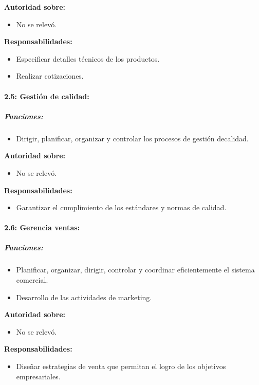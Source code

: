 \documentclass[a4paper,10pt]{article}
\begin{document}
		\textbf{Autoridad sobre:} 
		\begin{itemize}
			\item No se relevó.
		\end{itemize}

		\textbf{Responsabilidades:}
		\begin{itemize}
			\item Especificar detalles técnicos de los productos.
			\item Realizar cotizaciones.
		\end{itemize}

			\paragraph{2.5: Gestión de calidad:}
			\subparagraph{Funciones:}
			\begin{itemize}
	 			\item Dirigir, planificar, organizar y controlar los procesos de gestión decalidad.
	 		\end{itemize}
			

		\textbf{Autoridad sobre:} 
		\begin{itemize}
			\item No se relevó.
		\end{itemize}

		\textbf{Responsabilidades:}
		\begin{itemize}
			\item Garantizar el cumplimiento de los estándares y normas de calidad.
		\end{itemize}


			\paragraph{2.6: Gerencia ventas:}
			\subparagraph{Funciones:}
			\begin{itemize}
	 			\item Planificar, organizar, dirigir, controlar y coordinar eficientemente el sistema comercial.
	 			\item Desarrollo de las actividades de marketing.
	 		\end{itemize}
			

		\textbf{Autoridad sobre:} 
		\begin{itemize}
			\item No se relevó.
		\end{itemize}

		\textbf{Responsabilidades:}
		\begin{itemize}
			\item Diseñar estrategias de venta que permitan el logro de los objetivos empresariales.
		\end{itemize}
\end{document}
